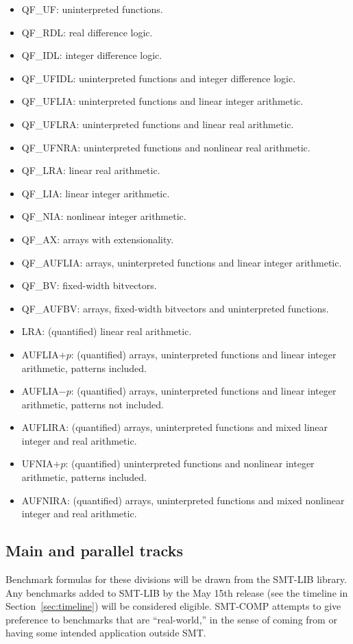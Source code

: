 \documentclass[12pt]{article}
\begin{document}
\begin{itemize}
\item QF\_UF: uninterpreted functions.
\item QF\_RDL: real difference logic.
\item QF\_IDL: integer difference logic.
\item QF\_UFIDL: uninterpreted functions and integer difference logic.
\item QF\_UFLIA: uninterpreted functions and linear integer arithmetic.
\item QF\_UFLRA: uninterpreted functions and linear real arithmetic.
\item QF\_UFNRA: uninterpreted functions and nonlinear real arithmetic.
\item QF\_LRA: linear real arithmetic.
\item QF\_LIA: linear integer arithmetic.
\item QF\_NIA: nonlinear integer arithmetic.
\item QF\_AX: arrays with extensionality.
\item QF\_AUFLIA: arrays, uninterpreted functions and linear integer 
                  arithmetic.
\item QF\_BV: fixed-width bitvectors.
\item QF\_AUFBV: arrays, fixed-width bitvectors and uninterpreted
functions.
\item LRA: (quantified) linear real arithmetic.
\item AUFLIA$+p$: (quantified) arrays, uninterpreted functions and 
linear integer arithmetic, patterns included.
\item AUFLIA$-p$: (quantified) arrays, uninterpreted functions and 
linear integer arithmetic, patterns not included.
\item AUFLIRA: (quantified) arrays, uninterpreted functions and 
mixed linear integer and real arithmetic.
\item UFNIA$+p$: (quantified) uninterpreted functions and 
nonlinear integer arithmetic, patterns included.
\item AUFNIRA: (quantified) arrays, uninterpreted functions and 
mixed nonlinear integer and real arithmetic.
\end{itemize}

\subsection{Main and parallel tracks}

Benchmark formulas for these divisions
will be drawn from the SMT-LIB library.  Any benchmarks added to
SMT-LIB by the May 15th release (see the timeline in
Section~\ref{sec:timeline}) will be considered eligible.  SMT-COMP
attempts to give preference to benchmarks that are ``real-world,'' in
the sense of coming from or having some intended application outside
SMT.
\end{document}
